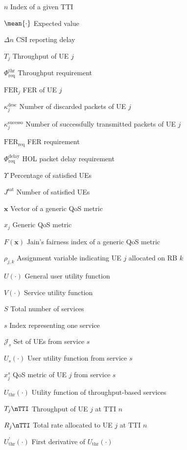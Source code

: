 \begin{simbolos}
	\item[$ n $] Index of a given TTI
	\item[$ \mean{\cdot} $] Expected value
	\item[$\Delta n$] CSI reporting delay
	\item[$ T_{j} $] Throughput of UE $j$
	\item[$ \Phi_{\text{req}}^{\text{thr}} $] Throughput requirement
	\item[$ \mathrm{FER}_j $] FER of UE $j$
	\item[$ \kappa^\mathrm{desc}_j $] Number of discarded packets of UE $j$
	\item[$ \kappa^\mathrm{sucesso}_j $] Number of successfully transmitted packets of UE $j$
	\item[$ \text{FER}_{\text{req}} $] FER requirement
	\item[$ \Phi_{\text{req}}^{\text{delay}} $] HOL packet delay requirement
	\item[$ \Upsilon $] Percentage of satisfied UEs
	\item[$ J^{\text{sat}} $] Number of satisfied UEs
	\item[$ \mathbf{x} $] Vector of a generic QoS metric
	\item[$ x_j $] Generic QoS metric
	\item[$ F(\mathbf{x}) $] Jain's fairness index of a generic QoS metric
	\item[$\rho_{j,k}$ ] Assignment variable indicating UE $j$ allocated on RB $k$
	\item[$ U\left( \cdot \right) $ ] General user utility function
	\item[$ V\left(\cdot\right) $ ] Service utility function
	\item[$ S $ ] Total number of services
	\item[$ s $ ] Index representing one service
	\item[$ \mathcal{J}_{s} $ ] Set of UEs from service $s$
	\item[$ U_{s}\left( \cdot \right) $ ] User utility function from service $s$
	\item[$ x_j^s $] QoS metric of UE $j$ from service $s$
	\item[$ U_{\mathrm{thr}}\left( \cdot \right) $ ] Utility function of throughput-based services
	\item[$ T_j \nTTI $] Throughput of UE $j$ at TTI $n$ 
	\item[$ R_j \nTTI $] Total rate allocated to UE $j$ at TTI $n$
	\item[$ U_{\mathrm{thr}}^{'}\left( \cdot \right) $] First derivative of $ U_{\mathrm{thr}}\left( \cdot \right) $

\end{simbolos}
